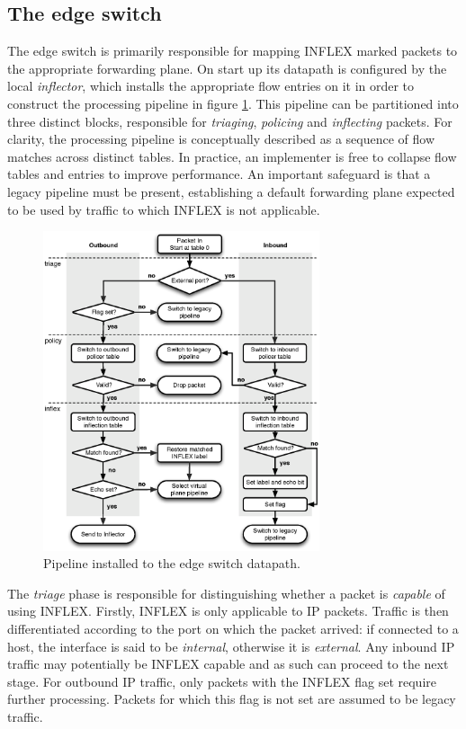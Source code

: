 \subsection{The edge switch}

The edge switch is primarily responsible for mapping INFLEX marked packets to the appropriate forwarding plane.
On start up its datapath is configured by the local \emph{inflector}, which installs the appropriate flow entries on it in order to construct the processing pipeline in figure \ref{fig:pipeline}.
This pipeline can be partitioned into three distinct blocks, responsible for \emph{triaging}, \emph{policing} and \emph{inflecting} packets.
For clarity, the processing pipeline is conceptually described as a sequence of flow matches across distinct tables.
In practice, an implementer is free to collapse flow tables and entries to improve performance.
An important safeguard is that a legacy pipeline must be present, establishing a default forwarding plane expected to be used by traffic to which INFLEX is not applicable.

\begin{figure}
    \centering
    \includegraphics[width=3.2in]{figures/inflex/flowchart}
    \caption{Pipeline installed to the edge switch datapath.}
    \label{fig:pipeline}
\end{figure}

The \emph{triage} phase is responsible for distinguishing whether a packet is \emph{capable} of using INFLEX.
Firstly, INFLEX is only applicable to \ac{IP} packets.
Traffic is then differentiated according to the port on which the packet arrived: if connected to a host, the interface is said to be \emph{internal}, otherwise it is \emph{external}.
Any inbound \ac{IP} traffic may potentially be INFLEX capable and as such can proceed to the next stage.
For outbound \ac{IP} traffic, only packets with the INFLEX flag set require further processing.
Packets for which this flag is not set are assumed to be legacy traffic.

